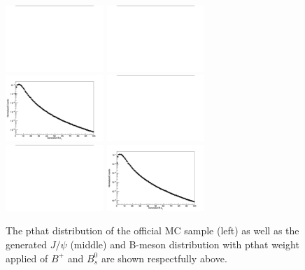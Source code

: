 \begin{figure}[h]
\begin{center}
\includegraphics[width= 0.33\textwidth]{Plots/MCReweight/GenInfo/BPpthat.png}
\includegraphics[width= 0.33\textwidth]{Plots/MCReweight/GenInfo/BPJPsiPt.png}
\includegraphics[width= 0.33\textwidth]{Plots/MCReweight/GenInfo/BPGpt.png}
\includegraphics[width= 0.33\textwidth]{Plots/MCReweight/GenInfo/Bspthat.png}
\includegraphics[width= 0.33\textwidth]{Plots/MCReweight/GenInfo/BsJPsiPt.png}
\includegraphics[width= 0.33\textwidth]{Plots/MCReweight/GenInfo/BsGpt.png}
\caption{The pthat distribution of the official MC sample (left) as well as the generated $J/\psi$ (middle) and B-meson \pt distribution with pthat weight applied of $B^{+}$ and $B^0_s$ are shown respectfully above.}
\label{fig:pthatWeightPlot}
\end{center}
\end{figure}

